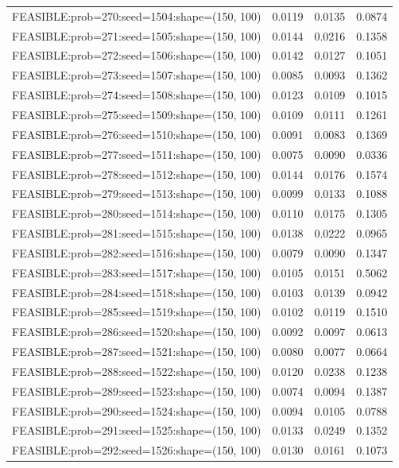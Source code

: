 \begin{longtable}{lccc}
FEASIBLE:prob=270:seed=1504:shape=(150, 100) & 0.0119 & 0.0135 & 0.0874 \\
FEASIBLE:prob=271:seed=1505:shape=(150, 100) & 0.0144 & 0.0216 & 0.1358 \\
FEASIBLE:prob=272:seed=1506:shape=(150, 100) & 0.0142 & 0.0127 & 0.1051 \\
FEASIBLE:prob=273:seed=1507:shape=(150, 100) & 0.0085 & 0.0093 & 0.1362 \\
FEASIBLE:prob=274:seed=1508:shape=(150, 100) & 0.0123 & 0.0109 & 0.1015 \\
FEASIBLE:prob=275:seed=1509:shape=(150, 100) & 0.0109 & 0.0111 & 0.1261 \\
FEASIBLE:prob=276:seed=1510:shape=(150, 100) & 0.0091 & 0.0083 & 0.1369 \\
FEASIBLE:prob=277:seed=1511:shape=(150, 100) & 0.0075 & 0.0090 & 0.0336 \\
FEASIBLE:prob=278:seed=1512:shape=(150, 100) & 0.0144 & 0.0176 & 0.1574 \\
FEASIBLE:prob=279:seed=1513:shape=(150, 100) & 0.0099 & 0.0133 & 0.1088 \\
FEASIBLE:prob=280:seed=1514:shape=(150, 100) & 0.0110 & 0.0175 & 0.1305 \\
FEASIBLE:prob=281:seed=1515:shape=(150, 100) & 0.0138 & 0.0222 & 0.0965 \\
FEASIBLE:prob=282:seed=1516:shape=(150, 100) & 0.0079 & 0.0090 & 0.1347 \\
FEASIBLE:prob=283:seed=1517:shape=(150, 100) & 0.0105 & 0.0151 & 0.5062 \\
FEASIBLE:prob=284:seed=1518:shape=(150, 100) & 0.0103 & 0.0139 & 0.0942 \\
FEASIBLE:prob=285:seed=1519:shape=(150, 100) & 0.0102 & 0.0119 & 0.1510 \\
FEASIBLE:prob=286:seed=1520:shape=(150, 100) & 0.0092 & 0.0097 & 0.0613 \\
FEASIBLE:prob=287:seed=1521:shape=(150, 100) & 0.0080 & 0.0077 & 0.0664 \\
FEASIBLE:prob=288:seed=1522:shape=(150, 100) & 0.0120 & 0.0238 & 0.1238 \\
FEASIBLE:prob=289:seed=1523:shape=(150, 100) & 0.0074 & 0.0094 & 0.1387 \\
FEASIBLE:prob=290:seed=1524:shape=(150, 100) & 0.0094 & 0.0105 & 0.0788 \\
FEASIBLE:prob=291:seed=1525:shape=(150, 100) & 0.0133 & 0.0249 & 0.1352 \\
FEASIBLE:prob=292:seed=1526:shape=(150, 100) & 0.0130 & 0.0161 & 0.1073 \\

\end{longtable}
